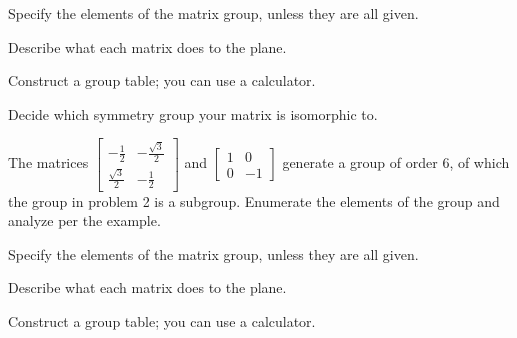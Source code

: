 \documentclass[../gatm_answers.tex]{subfiles}
\begin{document}
\begin{iinner_problem}[start=1]
\item Specify the elements of the matrix group, unless they are all given.
\end{iinner_problem}

\begin{iinner_problem}
\item Describe what each matrix does to the plane.
\end{iinner_problem}

\begin{iinner_problem}
\item Construct a group table; you can use a calculator.
\end{iinner_problem}

\begin{iinner_problem}
\item Decide which symmetry group your matrix is isomorphic to.
\end{iinner_problem}

\begin{outer_problem}
\item The matrices $\left[\begin{array}{cc} -\frac{1}{2} & -\frac{\sqrt{3}}{2} \\ \frac{\sqrt{3}}{2} & -\frac{1}{2}\end{array}\right]$ and $\left[\begin{array}{cc} 1 & 0 \\ 0 & -1 \end{array}\right]$ generate a group of order $6$, of which the group in problem 2 is a subgroup. Enumerate the elements of the group and analyze per the example.
\end{outer_problem}

\begin{iinner_problem}[start=1]
\item Specify the elements of the matrix group, unless they are all given.
\end{iinner_problem}

\begin{iinner_problem}
\item Describe what each matrix does to the plane.
\end{iinner_problem}

\begin{iinner_problem}
\item Construct a group table; you can use a calculator.
\end{iinner_problem}
\end{document}
